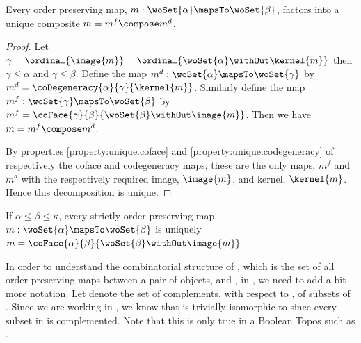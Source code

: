 \begin{lemma}\label{lemma:factorization}
Every order preserving map, $m : \woSet{\alpha} \mapsTo \woSet{\beta}$, factors into a
unique composite $m = m^f \compose m^d$.
\end{lemma}
\begin{proof}
Let $\gamma = \ordinal{\image{m}} = \ordinal{\woSet{\alpha}\withOut\kernel{m}}$ then
$\gamma \leq \alpha$ and $\gamma \leq \beta$.  Define the map $m^d : \woSet{\alpha}
\mapsTo \woSet{\gamma}$ by $m^d = \coDegeneracy{\alpha}{\gamma}{\kernel{m}}$.  Similarly
define the map $m^f : \woSet{\gamma} \mapsTo \woSet{\beta}$ by $m^f =
\coFace{\gamma}{\beta}{\woSet{\beta}\withOut\image{m}}$.  Then we have $m = m^f \compose
m^d$.
 
By properties \ref{property:unique.coface} and \ref{property:unique.codegeneracy} of
respectively the coface and codegeneracy maps, these are the only maps, $m^f$ and $m^d$
with the respectively required image, $\image{m}$, and kernel, $\kernel{m}$.  Hence this
decomposition is unique.
\end{proof}

\begin{corollary}
If $\alpha \leq \beta \leq \kappa$, every strictly order preserving map, $m :
\woSet{\alpha} \mapsTo \woSet{\beta}$ is uniquely $m =
\coFace{\alpha}{\beta}{\woSet{\beta}\withOut\image{m}}$.
\end{corollary}

In order to understand the combinatorial structure of
\homomorphisms{\DeltaC{}{}}{\woSet{\alpha}, \woSet{\beta}}, which is the set of all order
preserving maps between a pair of objects, \woSet{\alpha} and \woSet{\beta}, in
\DeltaC{}{}, we need to add a bit more notation. Let \powerSet[c]{\woSet{\alpha}} denote
the set of complements, with respect to \woSet{\alpha}, of subsets of \woSet{\alpha}. 
Since we are working in \setC{}, we know that \powerSet[c]{\woSet{\alpha}} is trivially
isomorphic to \powerSet{\woSet{\alpha}} since every subset in \setC{} is complemented. 
Note that this is only true in a Boolean Topos such as \setC{}.

